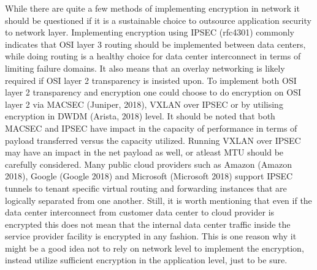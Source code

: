 \documentclass{article}
\begin{document}
While there are quite a few methods of implementing encryption in network it should be questioned if it is a sustainable choice to outsource application security to network layer. Implementing encryption using IPSEC (rfc4301) commonly indicates that OSI layer 3 routing should be implemented between data centers, while doing routing is a healthy choice for data center interconnect in terms of limiting failure domains. It also means that an overlay networking is likely required if OSI layer 2 transparency is insisted upon. To implement both OSI layer 2 transparency and encryption one could choose to do encryption on OSI layer 2 via MACSEC (Juniper, 2018), VXLAN over IPSEC or by utilising encryption in DWDM (Arista, 2018) level. It should be noted that both MACSEC and IPSEC have impact in the capacity of performance in terms of payload transferred versus the capacity utilized. Running VXLAN over IPSEC may have an impact in the net payload as well, or atleast MTU should be carefully considered. Many public cloud providers such as Amazon (Amazon 2018), Google (Google 2018) and Microsoft (Microsoft 2018) support IPSEC tunnels to tenant specific virtual routing and forwarding instances that are logically separated from one another. Still, it is worth mentioning that even if the data center interconnect from customer data center to cloud provider is encrypted this does not mean that the internal data center traffic inside the service provider facility is encrypted in any fashion. This is one reason why it might be a good idea not to rely on network level to implement the encryption, instead utilize sufficient encryption in the application level, just to be sure.
\end{document}
